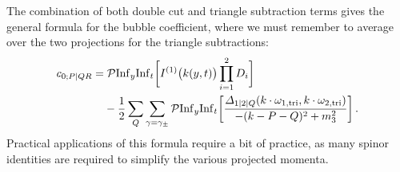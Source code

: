 The combination of both double cut and triangle subtraction terms gives the
general formula for the bubble coefficient, where we must remember to average
over the two projections for the triangle subtractions:
\begin{align} \label{eq:bubble_direct_extraction}
\begin{aligned}
  c_{0;P|QR} & =
  \mathcal{P} {\rm Inf}_y {\rm Inf}_t \bigg[ I^{(1)}\bigl(k(y,t)\bigr) \prod_{i=1}^2 D_i \bigg] \\
  & \phantom{ = {}} - \frac{1}{2} \sum_{Q} \sum_{\gamma=\gamma_\pm} \mathcal{P} {\rm Inf}_y {\rm Inf}_t \bigg[ \frac{\Delta_{1|2|Q}(k\cdot\omega_{1,{\rm tri}}, k\cdot\omega_{2,{\rm tri}})}{-(k-P-Q)^2+m_3^2} \bigg] \,.
\end{aligned}
\end{align}
Practical applications of this formula require a bit of practice, as many spinor identities are required to simplify the various projected momenta.

